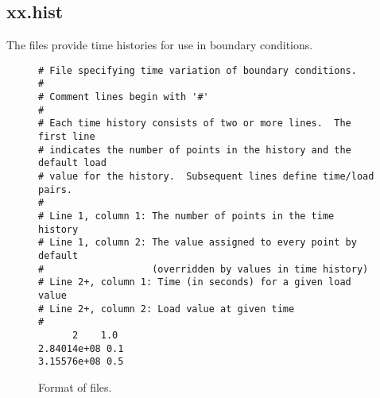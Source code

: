 \subsection{xx.hist}

The  files provide time histories for use in
boundary conditions.

\begin{figure}
  \begin{center}
\begin{verbatim}
# File specifying time variation of boundary conditions.
#
# Comment lines begin with '#'
#
# Each time history consists of two or more lines.  The first line
# indicates the number of points in the history and the default load
# value for the history.  Subsequent lines define time/load pairs.
#
# Line 1, column 1: The number of points in the time history
# Line 1, column 2: The value assigned to every point by default
#                   (overridden by values in time history)
# Line 2+, column 1: Time (in seconds) for a given load value
# Line 2+, column 2: Load value at given time
#
      2    1.0
2.84014e+08 0.1
3.15576e+08 0.5
\end{verbatim}
    \caption{Format of  files.}
  \end{center}
\end{figure}
